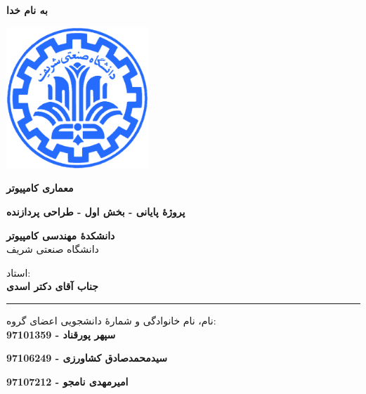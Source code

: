 \documentclass[12pt,titlepage,a4page , tikz , multi,table , svgnames,xcdraw]{article}
\begin{document}
\begin{titlepage}

 \begin{center}
        
       \vspace*{1cm}

 \vspace{1cm}
       \textbf{ \Huge{به نام خدا} }
       \vspace{0.4cm}
       
       \includegraphics[width=0.4\textwidth]{sharif1.png}
       
 	\vspace{0.7cm}
       \textbf{ \LARGE{معماری کامپیوتر} }

 
   \vspace{0.7cm}
  \textbf{ \Large{ پروژهٔ پایانی - بخش اول - طراحی پردازنده} }
   \vspace{0.5cm}
       
 
      \large \textbf{دانشکدهٔ مهندسی کامپیوتر}\\\vspace{0.2cm}
    \large   دانشگاه صنعتی شریف\\\vspace{0.25cm}
      
استاد:\\
    \textbf{{جناب آقای دکتر اسدی}}

    \vspace{0.15cm}
    \noindent\rule[1ex]{\linewidth}{3pt}
    
    \vspace{0.5cm}
نام، نام خانوادگی و شمارهٔ دانشجویی اعضای گروه:\\
    \textbf{{سپهر پورقناد - 97101359}}
        \vspace{0.1cm}
        
     \textbf{{سیدمحمدصادق کشاورزی - 97106249}}
        \vspace{0.1cm}
        
       \textbf{{امیرمهدی نامجو - 97107212}}
        \vspace{0.1cm}


\end{center}
\end{titlepage}
\end{document}
